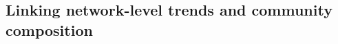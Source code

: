 \documentclass[12pt]{article}
\begin{document}
\begin{spacing}{1.5}




  \subsection*{Linking network-level trends and community composition}


\end{spacing}
\end{document}
